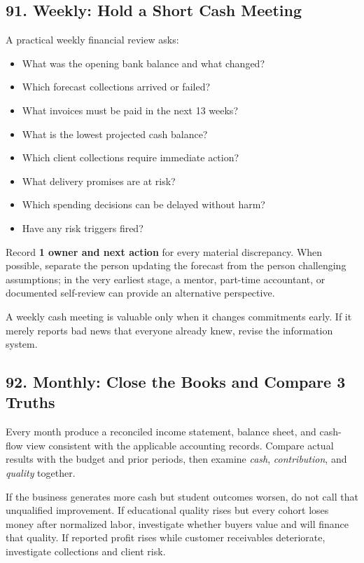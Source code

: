 \subsection*{91. Weekly: Hold a Short Cash Meeting}

A practical weekly financial review asks:
\begin{itemize}
\item What was the opening bank balance and what changed?
\item Which forecast collections arrived or failed?
\item What invoices must be paid in the next 13 weeks?
\item What is the lowest projected cash balance?
\item Which client collections require immediate action?
\item What delivery promises are at risk?
\item Which spending decisions can be delayed without harm?
\item Have any risk triggers fired?
\end{itemize}

Record \textbf{1 owner and next action} for every material discrepancy. When possible, separate the person updating the forecast from the person challenging assumptions; in the very earliest stage, a mentor, part-time accountant, or documented self-review can provide an alternative perspective.

A weekly cash meeting is valuable only when it changes commitments early. If it merely reports bad news that everyone already knew, revise the information system.

\subsection*{92. Monthly: Close the Books and Compare 3 Truths}

Every month produce a reconciled income statement, balance sheet, and cash-flow view consistent with the applicable accounting records. Compare actual results with the budget and prior periods, then examine \emph{cash}, \emph{contribution}, and \emph{quality} together.

If the business generates more cash but student outcomes worsen, do not call that unqualified improvement. If educational quality rises but every cohort loses money after normalized labor, investigate whether buyers value and will finance that quality. If reported profit rises while customer receivables deteriorate, investigate collections and client risk.

